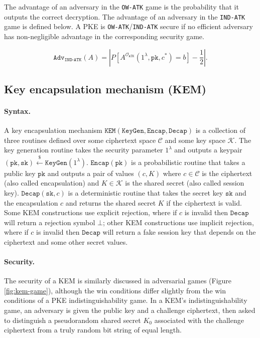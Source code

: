 \documentclass[runningheads]{llncs}
\newcommand{\keygen}{\texttt{KeyGen}}
\newcommand{\kem}{\texttt{KEM}}
\newcommand{\encap}{\texttt{Encap}}
\newcommand{\decap}{\texttt{Decap}}
\newcommand{\pk}{\texttt{pk}}
\newcommand{\sk}{\texttt{sk}}
\newcommand{\leftsample}{\stackrel{\$}{\leftarrow}}
\begin{document}
The advantage of an adversary in the \texttt{OW-ATK} game is the probability that it outputs the correct decryption. The advantage of an adversary in the \texttt{IND-ATK} game is defined below. A PKE is \texttt{OW-ATK}/\texttt{IND-ATK} secure if no efficient adversary has non-negligible advantage in the corresponding security game.

\begin{equation*}
    \texttt{Adv}_\texttt{IND-ATK}(A) = \left\vert P\left[A^{\mathcal{O}_\texttt{ATK}}(1^\lambda, \pk, c^\ast) = b \right] - \frac{1}{2} \right\vert.
\end{equation*}

\subsection{Key encapsulation mechanism (KEM)}
\paragraph{Syntax.} A key encapsulation mechanism $\kem(\keygen, \encap, \decap)$ is a collection of three routines defined over some ciphertext space $\mathcal{C}$ and some key space $\mathcal{K}$. The key generation routine takes the security parameter $1^\lambda$ and outputs a keypair $(\pk, \sk) \leftsample \keygen(1^\lambda)$. $\encap(\pk)$ is a probabilistic routine that takes a public key $\pk$ and outputs a pair of values $(c, K)$ where $c \in \mathcal{C}$ is the ciphertext (also called encapsulation) and $K \in \mathcal{K}$ is the shared secret (also called session key). $\decap(\sk, c)$ is a deterministic routine that takes the secret key $\sk$ and the encapsulation $c$ and returns the shared secret $K$ if the ciphertext is valid. Some KEM constructions use explicit rejection, where if $c$ is invalid then $\decap$ will return a rejection symbol $\bot$; other KEM constructions use implicit rejection, where if $c$ is invalid then $\decap$ will return a fake session key that depends on the ciphertext and some other secret values.

\paragraph{Security.} The security of a KEM is similarly discussed in adversarial games (Figure \ref{fig:kem-game}), although the win conditions differ slightly from the win conditions of a PKE indistinguishability game. In a KEM's indistinguishability game, an adversary is given the public key and a challenge ciphertext, then asked to distinguish a pseudorandom shared secret $K_0$ associated with the challenge ciphertext from a truly random bit string of equal length.
\end{document}

